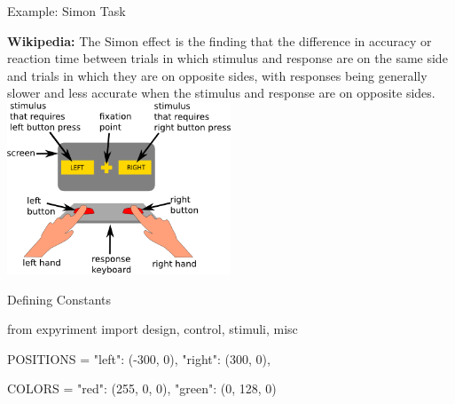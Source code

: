 \begin{frame}[fragile]{Example: Simon Task}

    \textbf{Wikipedia:} The Simon effect is the finding that the difference in 
    accuracy or reaction time between trials in which stimulus and response 
    are on the same side and trials in which they are on opposite sides, 
    with responses being generally slower and less accurate when the stimulus 
    and response are on opposite sides. \centering \includegraphics[width=0.5\textwidth]{13_Expyriment/simon.png}


\end{frame}

\begin{frame}[fragile]{Defining Constants}

    \begin{pythoncode}
from expyriment import design, control, stimuli, misc

POSITIONS = {
    "left": (-300, 0),
    "right": (300, 0),
}

COLORS = {
    "red": (255, 0, 0), 
    "green": (0, 128, 0)
}
    \end{pythoncode}


\end{frame}


